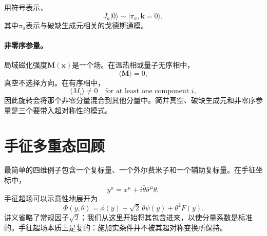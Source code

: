 \begin{classroomqa}
\end{classroomqa}

\begin{classroomqa}
\end{classroomqa}

用符号表示，
\begin{equation}
J_a|0\rangle
\sim
|\pi_a,\mathbf k=0\rangle,
\label{eq:l9-generator-goldstone}
\end{equation}
其中\(\pi_a\)表示与破缺生成元相关的戈德斯通模。

\paragraph{非零序参量。}
局域磁化强度\(\mathbf M(\mathbf x)\)是一个场。在温热相或量子无序相中，
\begin{equation}
\langle\mathbf M\rangle=0,
\end{equation}
真空不选择方向。在有序相中，
\begin{equation}
\langle M_i\rangle\neq0
\quad\text{for at least one component }i,
\label{eq:l9-magnetization-order}
\end{equation}
因此旋转会将那个非零分量混合到其他分量中。简并真空、破缺生成元和非零序参量是三个要带入超对称性的模式。

\section{手征多重态回顾}

最简单的四维例子包含一个复标量、一个外尔费米子和一个辅助复标量。在手征坐标中，
\begin{equation}
y^\mu=x^\mu+i\bar\theta\bar\sigma^\mu\theta,
\end{equation}
手征超场可以示意性地展开为
\begin{equation}
\Phi(y,\theta)=
\phi(y)+\sqrt2\,\theta\psi(y)+\theta^2F(y).
\label{eq:l9-chiral-expansion}
\end{equation}
讲义省略了常规因子\(\sqrt2\)；我们从这里开始将其包含进来，以使分量系数是标准的。手征超场本质上是复的：施加实条件并不被其超对称变换所保持。

